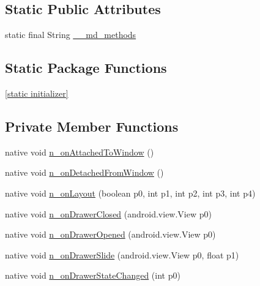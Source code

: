 \subsection*{Static Public Attributes}
\begin{CompactItemize}
\item 
static final String \hyperlink{classmd5b60ffeb829f638581ab2bb9b1a7f4f3f_1_1_master_detail_renderer_ce7bfaacfb9e54f304255e32cc2b83de}{\_\-\_\-md\_\-methods}
\end{CompactItemize}
\subsection*{Static Package Functions}
\begin{CompactItemize}
\item 
\hyperlink{classmd5b60ffeb829f638581ab2bb9b1a7f4f3f_1_1_master_detail_renderer_c1e5f5ead02baf5c9f7b8f39aa9b7bf3}{\mbox{[}static initializer\mbox{]}}
\end{CompactItemize}
\subsection*{Private Member Functions}
\begin{CompactItemize}
\item 
native void \hyperlink{classmd5b60ffeb829f638581ab2bb9b1a7f4f3f_1_1_master_detail_renderer_f0455920de5df3347462a39999f4a5f1}{n\_\-onAttachedToWindow} ()
\item 
native void \hyperlink{classmd5b60ffeb829f638581ab2bb9b1a7f4f3f_1_1_master_detail_renderer_72b03c07e0905178d271760b831852e0}{n\_\-onDetachedFromWindow} ()
\item 
native void \hyperlink{classmd5b60ffeb829f638581ab2bb9b1a7f4f3f_1_1_master_detail_renderer_2805b7105982e43568a166c5d77e8300}{n\_\-onLayout} (boolean p0, int p1, int p2, int p3, int p4)
\item 
native void \hyperlink{classmd5b60ffeb829f638581ab2bb9b1a7f4f3f_1_1_master_detail_renderer_a607de6aa7235ca631282bbb23e7d26b}{n\_\-onDrawerClosed} (android.view.View p0)
\item 
native void \hyperlink{classmd5b60ffeb829f638581ab2bb9b1a7f4f3f_1_1_master_detail_renderer_a1438cea935c74d489c8774d91c5a982}{n\_\-onDrawerOpened} (android.view.View p0)
\item 
native void \hyperlink{classmd5b60ffeb829f638581ab2bb9b1a7f4f3f_1_1_master_detail_renderer_c024767f1a779cb63d6b78821ad465ff}{n\_\-onDrawerSlide} (android.view.View p0, float p1)
\item 
native void \hyperlink{classmd5b60ffeb829f638581ab2bb9b1a7f4f3f_1_1_master_detail_renderer_476ee0d84f37c03b2ba382cc3da6fac2}{n\_\-onDrawerStateChanged} (int p0)
\end{CompactItemize}
